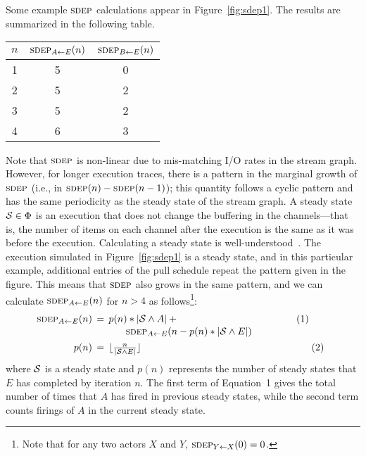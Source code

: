 Some example $\textsc{sdep}$ calculations appear in Figure~\ref{fig:sdep1}.
The results are summarized in the following table.
\begin{center}
\begin{tabular}{|c|c|c|}
\hline
$n$ & $\textsc{sdep}_{A \small{\leftarrow} E}(n)$ & $\textsc{sdep}_{B \small{\leftarrow} E}(n)$ \\
\hline \hline
1 & 5 & 0 \\ \hline
2 & 5 & 2 \\ \hline
3 & 5 & 2 \\ \hline
4 & 6 & 3 \\ \hline
\end{tabular}
\end{center}
Note that $\textsc{sdep}$ is non-linear due to mis-matching I/O rates in the
stream graph.  However, for longer execution traces, there is a
pattern in the marginal growth of $\textsc{sdep}$ (i.e., in $\textsc{sdep}(n) -
\textsc{sdep}(n-1)$); this quantity follows a cyclic pattern and has the same
periodicity as the steady state of the stream graph.  A steady state
${\cal S} \in \Phi$ is an execution that does not change the buffering
in the channels---that is, the number of items on each channel after
the execution is the same as it was before the execution.  Calculating
a steady state is well-understood~\cite{lee_static_1987}.  The
execution simulated in Figure~\ref{fig:sdep1} is a steady state, and
in this particular example, additional entries of the pull schedule
repeat the pattern given in the figure.  This means that $\textsc{sdep}$ also
grows in the same pattern, and we can calculate $\textsc{sdep}_{A \small{\leftarrow} E}(n)$ for
$n > 4$ as follows\footnote{Note that for any two actors $X$ and $Y$,
$\textsc{sdep}_{Y \small{\leftarrow} X}(0) = 0$.}:
\begin{equation}
\label{eq:sdep-steady}
\nonumber
\hspace{-4.5pt}\begin{array}{rcl}
\sdepf{A}{E}(n) \hspace{-5.5pt}&=&\hspace{-5.5pt} p(n) * |{\cal S} \wedge A| + ~~~~~~~~~~~~~~~~~~~~~~~~~~~~~\hspace{16.3pt}~~(1)\\[0.2Ex]
~&~&\mbox{~}\hspace{8.5pt} \sdepf{A}{E}(n - p(n) * |{\cal S} \wedge E|) \\[1Ex]
p(n) \hspace{-5.5pt}&=&\hspace{-5.5pt} \lfloor \frac{n}{|{\cal S} \wedge E|} \rfloor~~~~~~~~~~~~~~~~~~~~~~~~~~~~~~~~~~~~~\hspace{20pt}~~~~~~~~~(2) %
\end{array}
\end{equation}
where ${\cal S}$ is a steady state and $p(n)$ represents the number of
steady states that $E$ has completed by iteration $n$.  The first term
of Equation~1 gives the total number of times that $A$ has fired in
previous steady states, while the second term counts firings of $A$ in
the current steady state.

